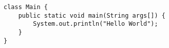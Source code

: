 \begin{verbatim}
class Main {
	public static void main(String args[]) {
		System.out.println("Hello World");
	}
}
\end{verbatim}

